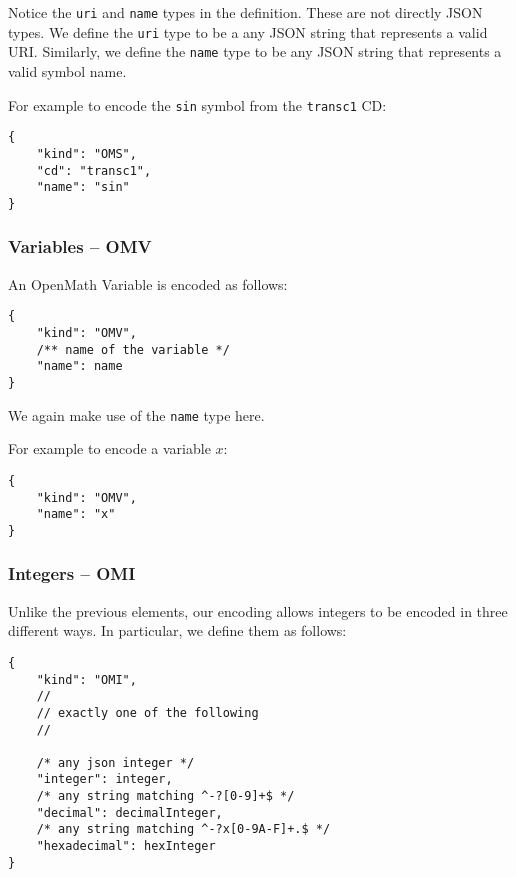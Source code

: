 Notice the \texttt{uri} and \texttt{name} types in the definition. 
These are not directly JSON types. 
We define the \texttt{uri} type to be a any JSON string that represents a valid URI. 
Similarly, we define the \texttt{name} type to be any JSON string that represents a valid symbol name. 

For example to encode the \texttt{sin} symbol from the \texttt{transc1} CD:
\begin{lstlisting}
{
    "kind": "OMS",
    "cd": "transc1",
    "name": "sin"
}
\end{lstlisting}

\subsubsection{Variables -- OMV}

An OpenMath Variable is encoded as follows:
\begin{lstlisting}
{
    "kind": "OMV",
    /** name of the variable */
    "name": name
}
\end{lstlisting}

We again make use of the \texttt{name} type here. 

For example to encode a variable $x$:
\begin{lstlisting}
{
    "kind": "OMV",
    "name": "x"
}
\end{lstlisting}

\subsubsection{Integers -- OMI}

Unlike the previous elements, our encoding allows integers to be encoded in three different ways. 
In particular, we define them as follows:
\begin{lstlisting}
{
    "kind": "OMI",
    //
    // exactly one of the following
    //

    /* any json integer */
    "integer": integer,
    /* any string matching ^-?[0-9]+$ */
    "decimal": decimalInteger,
    /* any string matching ^-?x[0-9A-F]+.$ */
    "hexadecimal": hexInteger
}
\end{lstlisting}

